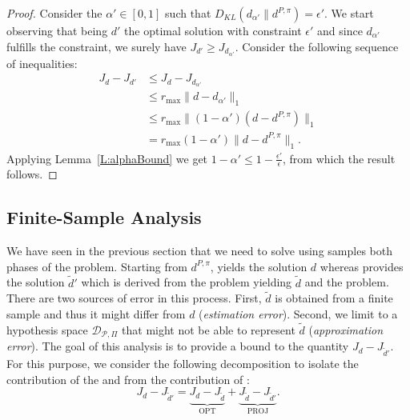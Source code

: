 \begin{proof}
	Consider the $\alpha' \in [0,1]$ such that $D_{KL}(d_{\alpha'} \| d^{P,\pi}) = \epsilon'$. We start observing that being $d'$ the optimal solution with constraint $\epsilon'$ and since $d_{\alpha'}$ fulfills the constraint, we surely have $J_{d'} \ge J_{d_{\alpha'}}$. Consider the following sequence of inequalities:
	\begin{align*}
		J_d - J_{d'} & \le J_d - J_{d_{\alpha'}}  \\
			& \le r_{\max} \|d - d_{\alpha'} \|_1  \\
			& \le r_{\max} \|(1-\alpha') (d - d^{P,\pi}) \|_1  \\
			& = r_{\max} (1-\alpha') \| d - d^{P,\pi} \|_1.
	\end{align*}
	Applying Lemma~\ref{L:alphaBound} we get $1-\alpha' \le 1 - \frac{\epsilon'}{\epsilon}$, from which the result follows.
\end{proof}

\subsection{Finite-Sample Analysis}
We have seen in the previous section that we need to solve using samples both phases of the \remps problem. Starting from $d^{P,\pi}$, \opt{\epsilon} yields the solution $d$ whereas \rempskappahat{\epsilon} provides the solution $\widetilde{d}'$ which is derived from the \opthat{\epsilon} problem yielding $\widetilde{d}$ and the  problem. There are two sources of error in this process. First, $\widetilde{d}$ is obtained from a finite sample and thus it might differ from $d$ (\emph{estimation error}). Second, we limit to a hypothesis space $\mathcal{D}_{\mathcal{P},\Pi}$ that might not be able to represent $\widetilde{d}$ (\emph{approximation error}). The goal of this analysis is to  provide a bound to the quantity $J_d - J_{\widetilde{d}'}$. For this purpose, we consider the following decomposition to isolate the contribution of the \opt{\epsilon} and \dual{\epsilon} from the contribution of \proj{\cdot}:
\begin{equation}
	J_d - J_{\widetilde{d}'} = \underbrace{J_d - J_{\widetilde{d}}}_{\text{OPT}} + \underbrace{J_{\widetilde{d}}- J_{\widetilde{d}'}}_{\mathrm{PROJ}}.
\end{equation}

